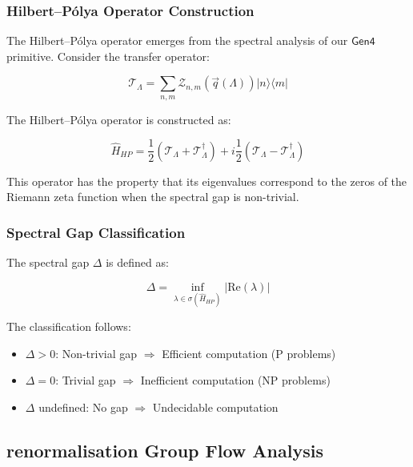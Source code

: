 \subsubsection{Hilbert–Pólya Operator Construction}

The Hilbert–Pólya operator emerges from the spectral analysis of our $\mathsf{Gen4}$ primitive. Consider the transfer operator:

\begin{equation}
\mathcal{T}_\Lambda = \sum_{n,m} \mathcal{Z}_{n,m}(\vec{q}(\Lambda)) |n\rangle\langle m|
\label{eq:transfer-operator}
\end{equation}

The Hilbert–Pólya operator is constructed as:

\begin{equation}
\hat{H}_{HP} = \frac{1}{2}(\mathcal{T}_\Lambda + \mathcal{T}_\Lambda^\dagger) + i\frac{1}{2}(\mathcal{T}_\Lambda - \mathcal{T}_\Lambda^\dagger)
\label{eq:hilbert-polya}
\end{equation}

This operator has the property that its eigenvalues correspond to the zeros of the Riemann zeta function when the spectral gap is non-trivial.

\subsubsection{Spectral Gap Classification}

The spectral gap $\Delta$ is defined as:

\begin{equation}
\Delta = \inf_{\lambda \in \sigma(\hat{H}_{HP})} |\text{Re}(\lambda)|
\label{eq:spectral-gap-def}
\end{equation}

The classification follows:
\begin{itemize}
\item $\Delta > 0$: Non-trivial gap $\Rightarrow$ Efficient computation (P problems)
\item $\Delta = 0$: Trivial gap $\Rightarrow$ Inefficient computation (NP problems)
\item $\Delta$ undefined: No gap $\Rightarrow$ Undecidable computation
\end{itemize}

\subsection{renormalisation Group Flow Analysis}

